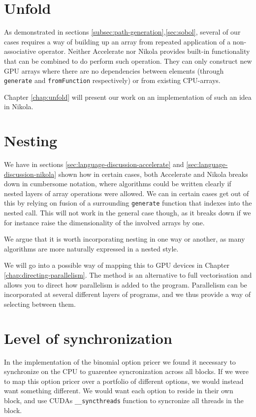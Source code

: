 \section{Unfold}

As demonstrated in sections \ref{subsec:path-generation},\ref{sec:sobol},
several of our cases requires a way of building up an array from repeated
application of a non-associative operator. Neither Accelerate nor Nikola
provides built-in functionality that can be combined to do perform such
operation. They can only construct new GPU arrays where there are no
dependencies between elements (through \texttt{generate} and
\texttt{fromFunction} respectively) or from existing CPU-arrays.

Chapter \ref{chap:unfold} will present our work on an implementation of such
an idea in Nikola.

\section{Nesting}

We have in sections \ref{sec:language-discussion-accelerate}
and \ref{sec:language-discussion-nikola} shown how in certain cases, both
Accelerate and Nikola breaks down in cumbersome notation, where algorithms
could be written clearly if nested layers of array operations were allowed. We
can in certain cases get out of this by relying on fusion of a surrounding
\texttt{generate} function that indexes into the nested call. This will not
work in the general case though, as it breaks down if we for instance raise the
dimensionality of the involved arrays by one.

We argue that it is worth incorporating nesting in one way or another,
as many algorithms are more naturally expressed in a nested style.

We will go into a possible way of mapping this to GPU devices in Chapter
\ref{chap:directing-parallelism}. The method is an alternative to full
vectorisation and allows you to direct how parallelism is added to the program.
Parallelism can be incorporated at several different layers of programs, and we
thus provide a way of selecting between them.

\section{Level of synchronization}
In the implementation of the binomial option pricer we found it
necessary to synchronize on the CPU to guarentee syncronization across
all blocks. If we were to map this option pricer over a portfolio of
different options, we would instead want something different. We would
want each option to reside in their own block, and use CUDAs
\texttt{\_\_syncthreads} function to syncronize all threads in the
block.

